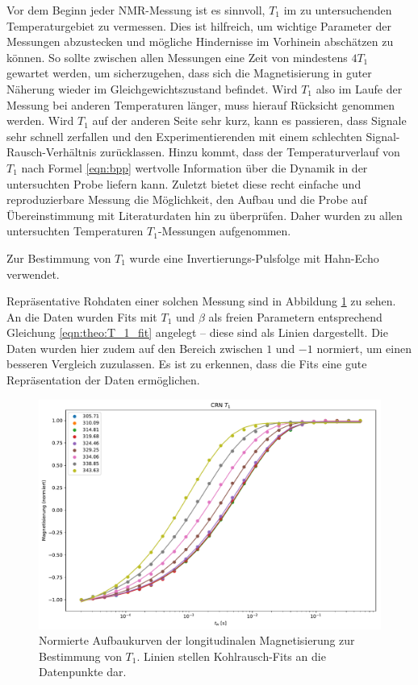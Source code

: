 Vor dem Beginn jeder NMR-Messung ist es sinnvoll, $T_1$ im zu untersuchenden Temperaturgebiet zu vermessen. Dies ist hilfreich, um wichtige Parameter der Messungen abzustecken und mögliche Hindernisse im Vorhinein abschätzen zu können. So sollte zwischen allen Messungen eine Zeit von mindestens $4 T_1$ gewartet werden, um sicherzugehen, dass sich die Magnetisierung in guter Näherung wieder im Gleichgewichtszustand befindet. Wird $T_1$ also im Laufe der Messung bei anderen Temperaturen länger, muss hierauf Rücksicht genommen werden. Wird $T_1$ auf der anderen Seite sehr kurz, kann es passieren, dass Signale sehr schnell zerfallen und den Experimentierenden mit einem schlechten Signal-Rausch-Verhältnis zurücklassen. Hinzu kommt, dass der Temperaturverlauf von $T_1$ nach Formel \eqref{eqn:bpp} wertvolle Information über die Dynamik in der untersuchten Probe liefern kann. Zuletzt bietet diese recht einfache und reproduzierbare Messung die Möglichkeit, den Aufbau und die Probe auf Übereinstimmung mit Literaturdaten hin zu überprüfen. Daher wurden zu allen untersuchten Temperaturen $T_1$-Messungen aufgenommen.

Zur Bestimmung von $T_1$ wurde eine Invertierungs-Pulsfolge mit Hahn-Echo verwendet.

Repräsentative Rohdaten einer solchen Messung sind in Abbildung \ref{fig:res:T_1_roh} zu sehen. An die Daten wurden Fits mit $T_1$ und $\beta$ als freien Parametern entsprechend Gleichung \eqref{eqn:theo:T_1_fit} angelegt -- diese sind als Linien dargestellt. Die Daten wurden hier zudem auf den Bereich zwischen $1$ und $-1$ normiert, um einen besseren Vergleich zuzulassen. Es ist zu erkennen, dass die Fits eine gute Repräsentation der Daten ermöglichen.
\begin{figure}
	\begin{center}
		\includegraphics[width=.9\textwidth]{graphics/plots/T1/t1_roh.pdf}
	\end{center}
	\caption{Normierte Aufbaukurven der longitudinalen Magnetisierung zur Bestimmung von $T_1$. Linien stellen Kohlrausch-Fits an die Datenpunkte dar.} \label{fig:res:T_1_roh}
\end{figure}

